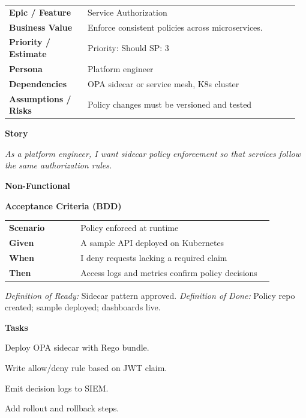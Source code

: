 \documentclass[11pt,letterpaper]{article}
\makeatletter
\newenvironment{kvtable}{%
  \par\noindent\begin{tabular}{@{}>{\raggedright\bfseries\arraybackslash}p{0.26\linewidth} >{\raggedright\arraybackslash}p{0.70\linewidth}@{}}
}{\end{tabular}\par}
\newenvironment{bdd}{%
  \par\noindent\begin{tabular}{@{}>{\raggedright\bfseries\arraybackslash}p{0.26\linewidth} >{\raggedright\arraybackslash}p{0.70\linewidth}@{}}
}{\end{tabular}\par}
\newcommand{\DoRDoD}[2]{%
  \vspace{0.35em}
  {\footnotesize\color{Muted}%
    \textit{Definition of Ready:} #1 \; \textbullet\;
    \textit{Definition of Done:} #2%
  }%
}
\newenvironment{storycard}[2]{%
  \begin{tcolorbox}[cloudcard, title={#1 --- #2}]%
}{\end{tcolorbox}}
\newcommand{\sectionlabel}[1]{\par\vspace{0.35em}\textbf{#1}\par}
\makeatother
\begin{document}
\begin{storycard}{CCS-12}{Ch. 12 — Distributed Access Control}
\begin{kvtable}
Epic / Feature & Service Authorization\\
Business Value & Enforce consistent policies across microservices.\\
Priority / Estimate & Priority: Should \quad SP: 3\\
Persona & Platform engineer\\
Dependencies & OPA sidecar or service mesh, K8s cluster\\
Assumptions / Risks & Policy changes must be versioned and tested\\
\end{kvtable}
\sectionlabel{Story}
\textit{As a platform engineer, I want sidecar policy enforcement so that services follow the same authorization rules.}
\sectionlabel{Non-Functional}\;
\sectionlabel{Acceptance Criteria (BDD)}
\begin{bdd}
Scenario & Policy enforced at runtime\\
Given & A sample API deployed on Kubernetes\\
When & I deny requests lacking a required claim\\
Then & Access logs and metrics confirm policy decisions\\
\end{bdd}
\DoRDoD{Sidecar pattern approved.}{Policy repo created; sample deployed; dashboards live.}
\sectionlabel{Tasks}
\begin{checklist}
\item Deploy OPA sidecar with Rego bundle.
\item Write allow/deny rule based on JWT claim.
\item Emit decision logs to SIEM.
\item Add rollout and rollback steps.
\end{checklist}
\end{storycard}
\end{document}
